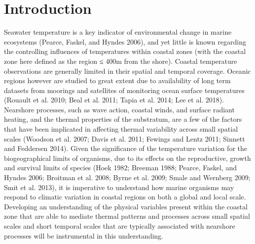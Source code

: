 \documentclass[12pt,a4paper,]{article}
\begin{document}
\newpage

\hypertarget{introduction}{%
\section{Introduction}\label{introduction}}

Seawater temperature is a key indicator of environmental change in
marine ecosystems (Pearce, Faskel, and Hyndes 2006), and yet little is
known regarding the controlling influences of temperatures within
coastal zones (with the coastal zone here defined as the region ≤ 400m
from the shore). Coastal temperature observations are generally limited
in their spatial and temporal coverage. Oceanic regions however are
studied to great extent due to availability of long term datasets from
moorings and satellites of monitoring ocean surface temperatures
(Rouault et al. 2010; Beal et al. 2011; Tapia et al. 2014; Lee et al.
2018). Nearshore processes, such as wave action, coastal winds, and
surface radiant heating, and the thermal properties of the substratum,
are a few of the factors that have been implicated in affecting thermal
variability across small spatial scales (Woodson et al. 2007; Davis et
al. 2011; Fewings and Lentz 2011; Sinnett and Feddersen 2014). Given the
significance of the temperature variation for the biogeographical limits
of organisms, due to its effects on the reproductive, growth and
survival limits of species (Hoek 1982; Breeman 1988; Pearce, Faskel, and
Hyndes 2006; Broitman et al. 2008; Byrne et al. 2009; Smale and Wernberg
2009; Smit et al. 2013), it is imperative to understand how marine
organisms may respond to climatic variation in coastal regions on both a
global and local scale. Developing an understanding of the physical
variables present within the coastal zone that are able to mediate
thermal patterns and processes across small spatial scales and short
temporal scales that are typically associated with nearshore processes
will be instrumental in this understanding.
\end{document}
